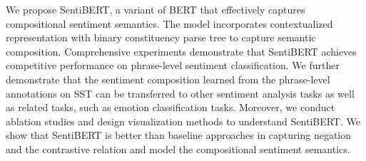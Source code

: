We propose SentiBERT, a variant of BERT that effectively captures compositional sentiment semantics. The model incorporates contextualized representation with binary constituency parse tree to capture semantic composition. Comprehensive experiments demonstrate that SentiBERT achieves competitive performance on phrase-level sentiment classification. We further demonstrate that the sentiment composition learned from the phrase-level annotations on SST can be transferred to other sentiment analysis tasks as well as related tasks, such as emotion classification tasks. Moreover, we conduct ablation studies and design visualization methods to understand SentiBERT. We show that SentiBERT is better than baseline approaches in capturing negation and the contrastive relation and model the compositional sentiment semantics.
